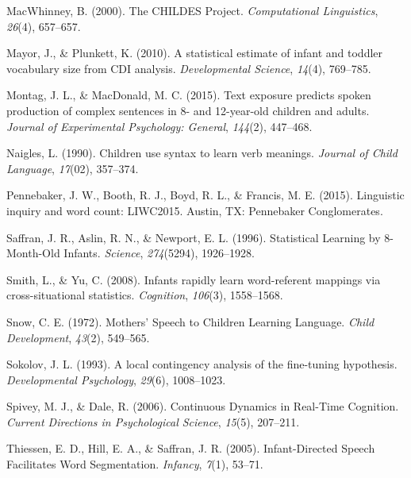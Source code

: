 \documentclass[10pt, letterpaper]{article}
\begin{document}
\leavevmode\hypertarget{ref-MacWhinney:2000jx}{}%
MacWhinney, B. (2000). The CHILDES Project. \emph{Computational
Linguistics}, \emph{26}(4), 657--657.

\leavevmode\hypertarget{ref-Mayor:2010kp}{}%
Mayor, J., \& Plunkett, K. (2010). A statistical estimate of infant and
toddler vocabulary size from CDI analysis. \emph{Developmental Science},
\emph{14}(4), 769--785.

\leavevmode\hypertarget{ref-Montag:2015iy}{}%
Montag, J. L., \& MacDonald, M. C. (2015). Text exposure predicts spoken
production of complex sentences in 8- and 12-year-old children and
adults. \emph{Journal of Experimental Psychology: General},
\emph{144}(2), 447--468.

\leavevmode\hypertarget{ref-Naigles:1990cw}{}%
Naigles, L. (1990). Children use syntax to learn verb meanings.
\emph{Journal of Child Language}, \emph{17}(02), 357--374.

\leavevmode\hypertarget{ref-Pennebaker:kqtgxul0}{}%
Pennebaker, J. W., Booth, R. J., Boyd, R. L., \& Francis, M. E. (2015).
Linguistic inquiry and word count: LIWC2015. Austin, TX: Pennebaker
Conglomerates.

\leavevmode\hypertarget{ref-Anonymous:6O2YEUCo}{}%
Saffran, J. R., Aslin, R. N., \& Newport, E. L. (1996). Statistical
Learning by 8-Month-Old Infants. \emph{Science}, \emph{274}(5294),
1926--1928.

\leavevmode\hypertarget{ref-Smith:2008gp}{}%
Smith, L., \& Yu, C. (2008). Infants rapidly learn word-referent
mappings via cross-situational statistics. \emph{Cognition},
\emph{106}(3), 1558--1568.

\leavevmode\hypertarget{ref-Snow:2018wf}{}%
Snow, C. E. (1972). Mothers' Speech to Children Learning Language.
\emph{Child Development}, \emph{43}(2), 549--565.

\leavevmode\hypertarget{ref-Sokolov:1993cr}{}%
Sokolov, J. L. (1993). A local contingency analysis of the fine-tuning
hypothesis. \emph{Developmental Psychology}, \emph{29}(6), 1008--1023.

\leavevmode\hypertarget{ref-Spivey:2006fa}{}%
Spivey, M. J., \& Dale, R. (2006). Continuous Dynamics in Real-Time
Cognition. \emph{Current Directions in Psychological Science},
\emph{15}(5), 207--211.

\leavevmode\hypertarget{ref-Thiessen:2005tx}{}%
Thiessen, E. D., Hill, E. A., \& Saffran, J. R. (2005). Infant-Directed
Speech Facilitates Word Segmentation. \emph{Infancy}, \emph{7}(1),
53--71.
\end{document}
